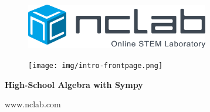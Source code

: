 \documentclass{article}
\begin{document}
\large

\vbox{}
\begin{figure}[!ht]
\includegraphics[width=8cm]{img/logo.png}
\vspace{29mm}
\end{figure}

\begin{figure}[!ht]
\begin{center}
\hspace{-20mm}
\texttt{[image: img/intro-frontpage.png]}
\vspace{29mm}
\end{center}
\end{figure}

\centerline{\Huge \bf High-School Algebra with Sympy}

\vfill

\centerline{\Large www.nclab.com}

\newpage




\section*{}
\small



\normalsize

\newpage
\setcounter{tocdepth}{2}
\tableofcontents

\newpage

\pagestyle{plain}
\setcounter{page}{1}


\newpage

\pagestyle{plain}
\end{document}
